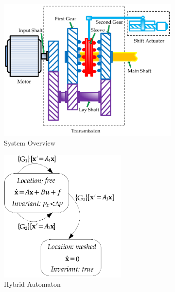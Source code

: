 \begin{figure}[t]
\begin{subfigure}{0.3\textwidth}
\centering
    \includegraphics[width=1.0\textwidth]{images/gb_overview1.png}
    \caption{System Overview}\label{fig:gbo_1}
\end{subfigure}
\begin{subfigure}{0.3\textwidth}
\centering
    \includegraphics[width=0.7\textwidth]{images/gb_overview2.png}
    \caption{Hybrid Automaton}\label{fig:gbo_2}
\end{subfigure}
\begin{subfigure}{0.3\textwidth}
\centering

\end{subfigure}
\end{figure}
